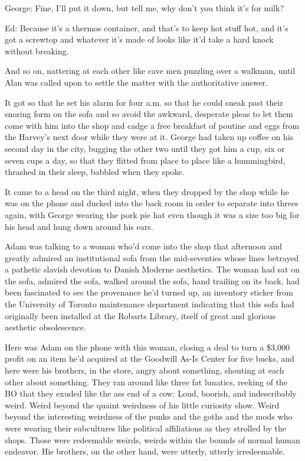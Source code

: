 George:  Fine, I'll put it down, but tell me, why don't you think it's
for milk?

Ed:  Because it's a thermos container, and that's to keep hot stuff
hot, and it's got a screwtop and whatever it's made of looks like it'd
take a hard knock without breaking.

And so on, nattering at each other like cave men puzzling over a
walkman, until Alan was called upon to settle the matter with the
authoritative answer.

It got so that he set his alarm for four a.m.  so that he could sneak
past their snoring form on the sofa and so avoid the awkward,
desperate pleas to let them come with him into the shop and cadge a
free breakfast of poutine and eggs from the Harvey's next door while
they were at it.  George had taken up coffee on his second day in the
city, bugging the other two until they got him a cup, six or seven
cups a day, so that they flitted from place to place like a
hummingbird, thrashed in their sleep, babbled when they spoke.

It came to a head on the third night, when they dropped by the shop
while he was on the phone and ducked into the back room in order to
separate into threes again, with George wearing the pork pie hat even
though it was a size too big for his head and hung down around his
ears.

Adam was talking to a woman who'd come into the shop that afternoon
and greatly admired an institutional sofa from the mid-seventies whose
lines betrayed a pathetic slavish devotion to Danish Moderne
aesthetics.  The woman had sat on the sofa, admired the sofa, walked
around the sofa, hand trailing on its back, had been fascinated to see
the provenance he'd turned up, an inventory sticker from the
University of Toronto maintenance department indicating that this sofa
had originally been installed at the Robarts Library, itself of great
and glorious aesthetic obsolescence.

Here was Adam on the phone with this woman, closing a deal to turn a
\$3,000 profit on an item he'd acquired at the Goodwill As-Is Center
for five bucks, and here were his brothers, in the store, angry about
something, shouting at each other about something.  They ran around
like three fat lunatics, reeking of the BO that they exuded like the
ass end of a cow:  Loud, boorish, and indescribably weird.  Weird
beyond the quaint weirdness of his little curiosity show.  Weird
beyond the interesting weirdness of the punks and the goths and the
mods who were wearing their subcultures like political affiliations as
they strolled by the shops.  Those were redeemable weirds, weirds
within the bounds of normal human endeavor.  His brothers, on the
other hand, were utterly, utterly irredeemable.

